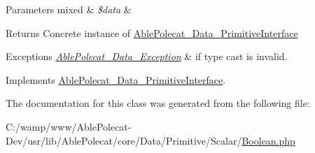 \begin{DoxyParams}[1]{Parameters}
mixed & {\em \$data} & \\
\hline
\end{DoxyParams}
\begin{DoxyReturn}{Returns}
Concrete instance of \hyperlink{interface_able_polecat___data___primitive_interface}{Able\+Polecat\+\_\+\+Data\+\_\+\+Primitive\+Interface} 
\end{DoxyReturn}

\begin{DoxyExceptions}{Exceptions}
{\em \hyperlink{class_able_polecat___data___exception}{Able\+Polecat\+\_\+\+Data\+\_\+\+Exception}} & if type cast is invalid. \\
\hline
\end{DoxyExceptions}


Implements \hyperlink{interface_able_polecat___data___primitive_interface_a68640750b79d1cdda3cddcece68a207e}{Able\+Polecat\+\_\+\+Data\+\_\+\+Primitive\+Interface}.



The documentation for this class was generated from the following file\+:\begin{DoxyCompactItemize}
\item 
C\+:/wamp/www/\+Able\+Polecat-\/\+Dev/usr/lib/\+Able\+Polecat/core/\+Data/\+Primitive/\+Scalar/\hyperlink{_boolean_8php}{Boolean.\+php}\end{DoxyCompactItemize}
